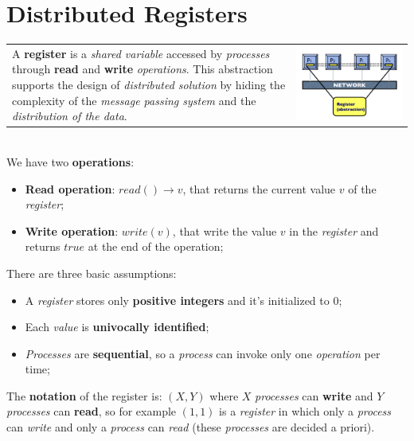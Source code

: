 \documentclass{article}
\begin{document}
\section{Distributed Registers}
\begin{tabular}{C{10.5cm}  L{10.5cm}}
A \textbf{register} is a \emph{shared variable} accessed by \emph{processes} through \textbf{read} and \textbf{write} \emph{operations}. This abstraction supports the design of \emph{distributed solution} by hiding the complexity of the \emph{message passing system} and the \emph{distribution of the data}. & \includegraphics[scale=0.5]{cattura61.png}
\end{tabular}\\
We have two \textbf{operations}:
\begin{itemize}
\item \textbf{Read operation}: $read() \rightarrow v$, that returns the current value $v$ of the \emph{register};
\item \textbf{Write operation}: $write(v)$, that write the value $v$ in the \emph{register} and returns $true$ at the end of the operation;
\end{itemize}
There are three basic assumptions:
\begin{itemize}
\item A \emph{register} stores only \textbf{positive integers} and it's initialized to 0;
\item Each \emph{value} is \textbf{univocally identified};
\item \emph{Processes} are \textbf{sequential}, so a \emph{process} can invoke only one \emph{operation} per time;
\end{itemize}
The \textbf{notation} of the register is: $(X,Y)$ where $X$ \emph{processes} can \textbf{write} and $Y$ \emph{processes} can \textbf{read}, so for example $(1,1)$ is a \emph{register} in which only a \emph{process} can \emph{write} and only a \emph{process} can \emph{read} (these \emph{processes} are decided a priori).\\\\
\end{document}
